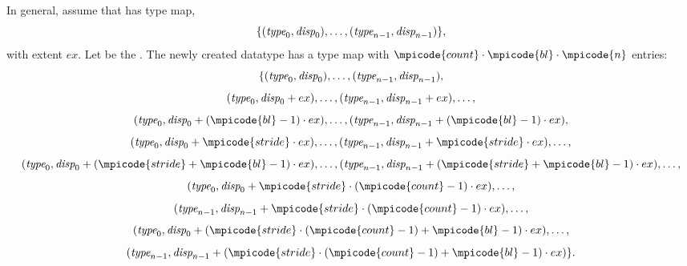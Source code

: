 In general, assume that  has type map,
\begin{displaymath}
\{ (\textrm{\itshape{type}}_0,\textrm{\itshape{disp}}_0), \ldots, (\textrm{\itshape{type}}_{n-1}, \textrm{\itshape{disp}}_{n-1}) \} ,
\end{displaymath}
with extent $ex$.  Let  be the .
The newly created  datatype has a type map with
$\mpicode{count} \cdot \mpicode{bl} \cdot \mpicode{n}$
entries:
\begin{displaymath}
\{
(\textrm{\itshape{type}}_0, \textrm{\itshape{disp}}_0), \ldots , (\textrm{\itshape{type}}_{n-1} , \textrm{\itshape{disp}}_{n-1}),
\end{displaymath}
\begin{displaymath}
(\textrm{\itshape{type}}_0 ,\textrm{\itshape{disp}}_0 + ex) , \ldots ,
(\textrm{\itshape{type}}_{n-1} , \textrm{\itshape{disp}}_{n-1} + ex ), \ldots,
\end{displaymath}
\begin{displaymath}
(\mword{type}_0 , \mword{disp}_0 + (\mpicode{bl} -1) \cdot ex
) , \ldots , (\mword{type}_{n-1} , \mword{disp}_{n-1} + (\mpicode{bl} -1) \cdot ex ) ,
\end{displaymath}
\begin{displaymath}
(\mword{type}_0 ,\mword{disp}_0 + \mpicode{stride} \cdot ex ) , \ldots ,
(\mword{type}_{n-1} , \mword{disp}_{n-1} + \mpicode{stride} \cdot ex ), \ldots ,
\end{displaymath}
\begin{displaymath}
(\mword{type}_0 , \mword{disp}_0 + (\mpicode{stride} + \mpicode{bl} -1) \cdot ex ) , \ldots ,
(\mword{type}_{n-1}, \mword{disp}_{n-1} + (\mpicode{stride} + \mpicode{bl} -1) \cdot
ex ) , \ldots ,
\end{displaymath}
\begin{displaymath}
(\mword{type}_0 ,\mword{disp}_0 + \mpicode{stride} \cdot (\mpicode{count}-1) \cdot ex ) , \ldots ,
\end{displaymath}
\begin{displaymath}
(\mword{type}_{n-1} , \mword{disp}_{n-1} + \mpicode{stride} \cdot (\mpicode{count} -1) \cdot
ex )
, \ldots ,
\end{displaymath}
\begin{displaymath}
(\mword{type}_0 , \mword{disp}_0 + (\mpicode{stride} \cdot (\mpicode{count} -1)
+ \mpicode{bl} -1) \cdot ex ) , \ldots ,
\end{displaymath}
\begin{displaymath}
(\mword{type}_{n-1}, \mword{disp}_{n-1} + (\mpicode{stride} \cdot (\mpicode{count} -1)
+ \mpicode{bl} -1) \cdot ex )
\} .
\end{displaymath}

